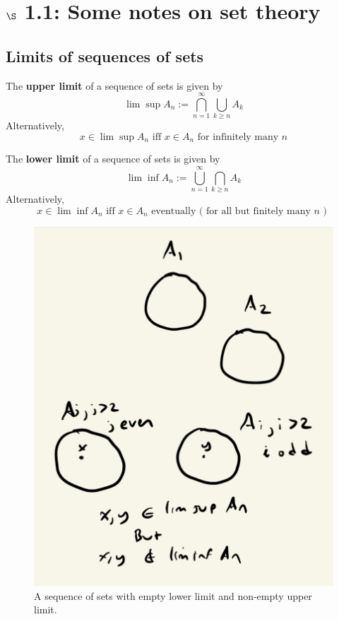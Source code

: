\documentclass{article} %
\begin{document}



\section{$\S$ 1.1: Some notes on set theory}

\subsection{Limits of sequences of sets}

\begin{definition}
The \textbf{upper limit} of a sequence of sets is given by
\[ \lim\sup A_n := \bigcap_{n=1}^\infty \bigcup_{k \geq n} A_k \]
Alternatively,
\[ x \in \lim\sup A_n \text{ iff } x \in A_n \text{ for infinitely many } n \]
\end{definition}

\begin{definition}
The \textbf{lower limit} of a sequence of sets is given by
\[ \lim\inf A_n := \bigcup_{n=1}^\infty \bigcap_{k \geq n} A_k \]
Alternatively,
\[ x \in \lim\inf A_n \text{ iff } x \in A_n \text{ eventually ( for all but finitely many $n$ ) } \]
\end{definition}

\begin{figure}
\centering 
\includegraphics[width=.5\textwidth]{images/limsup_and_liminf}	
\caption{A sequence of sets with empty lower limit and non-empty upper limit.}
\end{figure}
\end{document}
